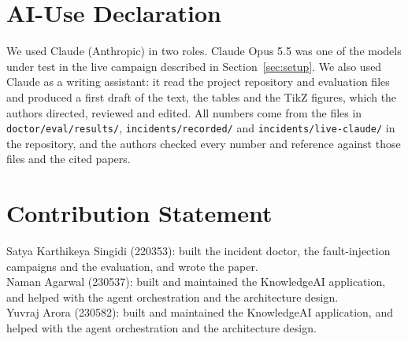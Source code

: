 \documentclass[12pt,onecolumn,draftclsnofoot]{IEEEtran}
\begin{document}
\section*{AI-Use Declaration}
We used Claude (Anthropic) in two roles. Claude Opus 5.5 was one of the models under test in the live campaign described in Section~\ref{sec:setup}. We also used Claude as a writing assistant: it read the project repository and evaluation files and produced a first draft of the text, the tables and the TikZ figures, which the authors directed, reviewed and edited. All numbers come from the files in \texttt{doctor/eval/results/}, \texttt{incidents/recorded/} and \texttt{incidents/live-claude/} in the repository, and the authors checked every number and reference against those files and the cited papers.

\section*{Contribution Statement}
\noindent Satya Karthikeya Singidi (220353): built the incident doctor, the fault-injection campaigns and the evaluation, and wrote the paper.\\
Naman Agarwal (230537): built and maintained the KnowledgeAI application, and helped with the agent orchestration and the architecture design.\\
Yuvraj Arora (230582): built and maintained the KnowledgeAI application, and helped with the agent orchestration and the architecture design.



\end{document}
